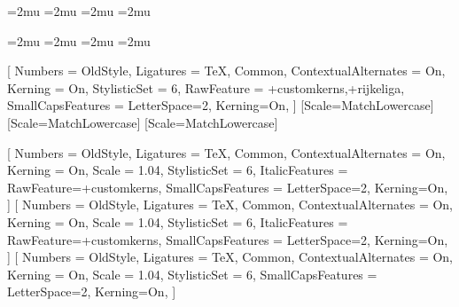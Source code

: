 

\usepackage[
  script,
  scriptscript,
  no-inner,
  no-close,
  no-cover
]{innerscript}

\Umathordbinspacing\scriptstyle=2mu
\Umathbinordspacing\scriptstyle=2mu
\Umathordbinspacing\crampedscriptstyle=2mu
\Umathbinordspacing\crampedscriptstyle=2mu

\Umathordrelspacing\scriptstyle=2mu
\Umathrelordspacing\scriptstyle=2mu
\Umathordrelspacing\crampedscriptstyle=2mu
\Umathrelordspacing\crampedscriptstyle=2mu


\setmainfont{Libertinus Serif}[
  Numbers = OldStyle,
  Ligatures = {TeX, Common},
  ContextualAlternates = On,
  Kerning = On,
  StylisticSet = {6},
  RawFeature = {+customkerns,+rijkeliga},
  SmallCapsFeatures = {LetterSpace=2, Kerning=On},
]
[Scale=MatchLowercase]
\setsansfont{Libertinus Sans}[Scale=MatchLowercase]
\setmonofont{Libertinus Mono}[Scale=MatchLowercase]


\newcommand{\VersionFontName}{Libertinus}

\newfontfamily{}[
  Numbers = OldStyle,
  Ligatures = {TeX, Common},
  ContextualAlternates = On,
  Kerning = On,
  Scale = 1.04,
  StylisticSet = {6},
  ItalicFeatures = {RawFeature={+customkerns}},
  SmallCapsFeatures = {LetterSpace=2, Kerning=On},
  ]
\newfontfamily{}[
  Numbers = OldStyle,
  Ligatures = {TeX, Common},
  ContextualAlternates = On,
  Kerning = On,
  Scale = 1.04,
  StylisticSet = {6},
  ItalicFeatures = {RawFeature={+customkerns}},
  SmallCapsFeatures = {LetterSpace=2, Kerning=On},
  ]
\newfontfamily{}[
  Numbers = OldStyle,
  Ligatures = {TeX, Common},
  ContextualAlternates = On,
  Kerning = On,
  Scale = 1.04, StylisticSet = {6},
  SmallCapsFeatures = {LetterSpace=2, Kerning=On},
  ]

\newfontfamily{}

